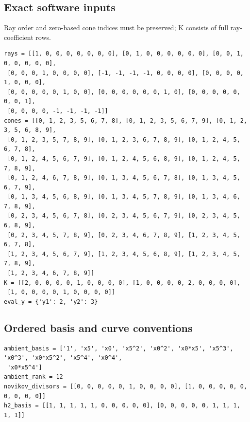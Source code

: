 \documentclass[10pt,a4paper]{article}
\begin{document}
\subsection*{Exact software inputs}
Ray order and zero-based cone indices must be preserved; K consists of full ray-coefficient rows.
\begin{lstlisting}
rays = [[1, 0, 0, 0, 0, 0, 0, 0], [0, 1, 0, 0, 0, 0, 0, 0], [0, 0, 1, 0, 0, 0, 0, 0],
 [0, 0, 0, 1, 0, 0, 0, 0], [-1, -1, -1, -1, 0, 0, 0, 0], [0, 0, 0, 0, 1, 0, 0, 0],
 [0, 0, 0, 0, 0, 1, 0, 0], [0, 0, 0, 0, 0, 0, 1, 0], [0, 0, 0, 0, 0, 0, 0, 1],
 [0, 0, 0, 0, -1, -1, -1, -1]]
cones = [[0, 1, 2, 3, 5, 6, 7, 8], [0, 1, 2, 3, 5, 6, 7, 9], [0, 1, 2, 3, 5, 6, 8, 9],
 [0, 1, 2, 3, 5, 7, 8, 9], [0, 1, 2, 3, 6, 7, 8, 9], [0, 1, 2, 4, 5, 6, 7, 8],
 [0, 1, 2, 4, 5, 6, 7, 9], [0, 1, 2, 4, 5, 6, 8, 9], [0, 1, 2, 4, 5, 7, 8, 9],
 [0, 1, 2, 4, 6, 7, 8, 9], [0, 1, 3, 4, 5, 6, 7, 8], [0, 1, 3, 4, 5, 6, 7, 9],
 [0, 1, 3, 4, 5, 6, 8, 9], [0, 1, 3, 4, 5, 7, 8, 9], [0, 1, 3, 4, 6, 7, 8, 9],
 [0, 2, 3, 4, 5, 6, 7, 8], [0, 2, 3, 4, 5, 6, 7, 9], [0, 2, 3, 4, 5, 6, 8, 9],
 [0, 2, 3, 4, 5, 7, 8, 9], [0, 2, 3, 4, 6, 7, 8, 9], [1, 2, 3, 4, 5, 6, 7, 8],
 [1, 2, 3, 4, 5, 6, 7, 9], [1, 2, 3, 4, 5, 6, 8, 9], [1, 2, 3, 4, 5, 7, 8, 9],
 [1, 2, 3, 4, 6, 7, 8, 9]]
K = [[2, 0, 0, 0, 0, 1, 0, 0, 0, 0], [1, 0, 0, 0, 0, 2, 0, 0, 0, 0],
 [1, 0, 0, 0, 0, 1, 0, 0, 0, 0]]
eval_y = {'y1': 2, 'y2': 3}
\end{lstlisting}
\subsection*{Ordered basis and curve conventions}
\begin{lstlisting}
ambient_basis = ['1', 'x5', 'x0', 'x5^2', 'x0^2', 'x0*x5', 'x5^3', 'x0^3', 'x0*x5^2', 'x5^4', 'x0^4',
 'x0*x5^4']
ambient_rank = 12
novikov_divisors = [[0, 0, 0, 0, 0, 1, 0, 0, 0, 0], [1, 0, 0, 0, 0, 0, 0, 0, 0, 0]]
h2_basis = [[1, 1, 1, 1, 1, 0, 0, 0, 0, 0], [0, 0, 0, 0, 0, 1, 1, 1, 1, 1]]
\end{lstlisting}
\end{document}
